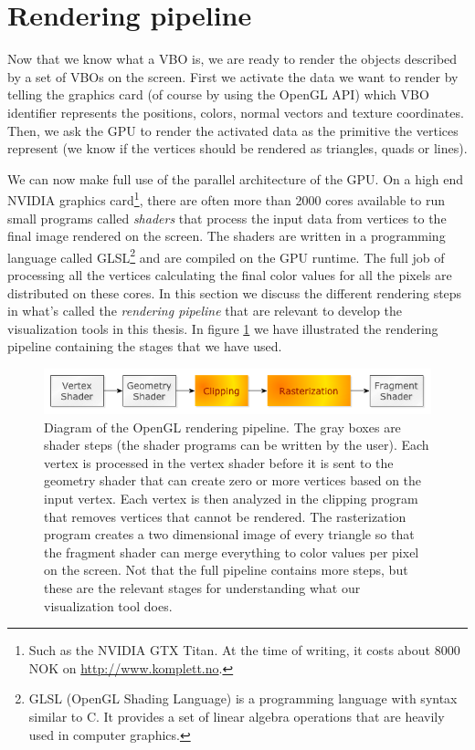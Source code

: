 \section{Rendering pipeline}
\label{sec:opengl_rendering_pipeline}
Now that we know what a VBO is, we are ready to render the objects described by a set of VBOs on the screen. First we activate the data we want to render by telling the graphics card (of course by using the OpenGL API) which VBO identifier represents the positions, colors, normal vectors and texture coordinates. Then, we ask the GPU to render the activated data as the primitive the vertices represent (we know if the vertices should be rendered as triangles, quads or lines).

We can now make full use of the parallel architecture of the GPU. On a high end NVIDIA graphics card\footnote{Such as the NVIDIA GTX Titan. At the time of writing, it costs about 8000 NOK on \url{http://www.komplett.no}.}, there are often more than 2000 cores available to run small programs called \textit{shaders} that process the input data from vertices to the final image rendered on the screen. The shaders are written in a programming language called GLSL\footnote{GLSL (OpenGL Shading Language) is a programming language with syntax similar to C. It provides a set of linear algebra operations that are heavily used in computer graphics.} and are compiled on the GPU runtime. The full job of processing all the vertices calculating the final color values for all the pixels are distributed on these cores. In this section we discuss the different rendering steps in what's called the \textit{rendering pipeline} that are relevant to develop the visualization tools in this thesis. In figure \ref{fig:opengl_rendering_pipeline} we have illustrated the rendering pipeline containing the stages that we have used. 
\begin{figure}[h]
\begin{center}
\includegraphics[width=\textwidth, trim=0cm 0cm 0cm 0cm, clip]{opengl/figures/pipeline.png}
\end{center}
\caption{Diagram of the OpenGL rendering pipeline. The gray boxes are shader steps (the shader programs can be written by the user). Each vertex is processed in the vertex shader before it is sent to the geometry shader that can create zero or more vertices based on the input vertex. Each vertex is then analyzed in the clipping program that removes vertices that cannot be rendered. The rasterization program creates a two dimensional image of every triangle so that the fragment shader can merge everything to color values per pixel on the screen. Not that the full pipeline contains more steps, but these are the relevant stages for understanding what our visualization tool does.}
\label{fig:opengl_rendering_pipeline}
\end{figure}
